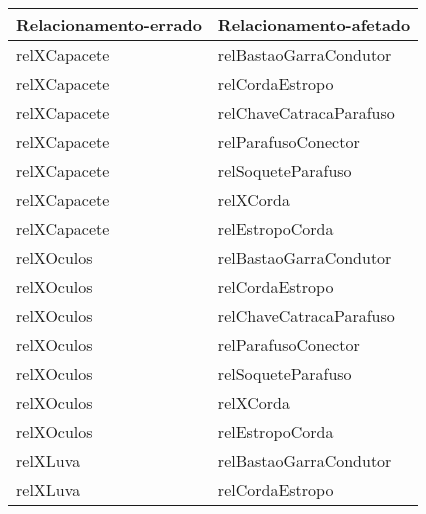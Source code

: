 \begin{center}
\begin{longtable}[H]{|l|l|}
\hline
\textbf{Relacionamento-errado} 					& \textbf{Relacionamento-afetado}   			   \\ \hline
relXCapacete                                    & relBastaoGarraCondutor                           \\ \hline
relXCapacete                                    & relCordaEstropo                                  \\ \hline
relXCapacete                                    & relChaveCatracaParafuso                          \\ \hline
relXCapacete                                    & relParafusoConector                              \\ \hline
relXCapacete                                    & relSoqueteParafuso                               \\ \hline
relXCapacete                                    & relXCorda                                        \\ \hline
relXCapacete                                    & relEstropoCorda                                  \\ \hline
relXOculos                                      & relBastaoGarraCondutor                           \\ \hline
relXOculos                                      & relCordaEstropo                                  \\ \hline
relXOculos                                      & relChaveCatracaParafuso                          \\ \hline
relXOculos                                      & relParafusoConector                              \\ \hline
relXOculos                                      & relSoqueteParafuso                               \\ \hline
relXOculos                                      & relXCorda                                        \\ \hline
relXOculos                                      & relEstropoCorda                                  \\ \hline
relXLuva                                        & relBastaoGarraCondutor                           \\ \hline
relXLuva                                        & relCordaEstropo                                  \\ \hline

\end{longtable}
\end{center}
